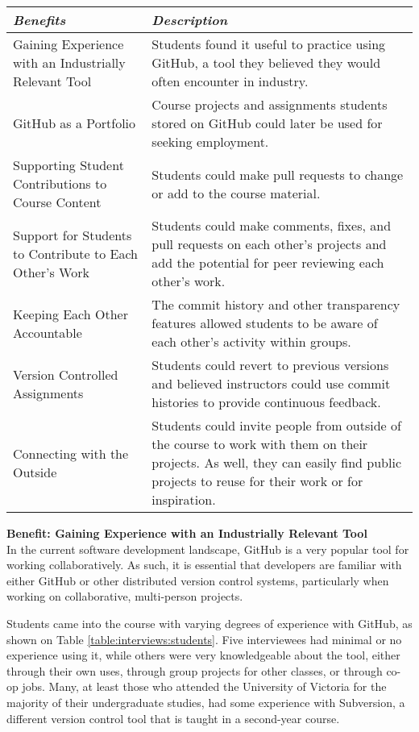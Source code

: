 \begin{center}
\begin{tabular}{ | m{2em} | m{5cm} | }
\hline
\emph{Benefits} & \emph{Description} \\
\hline
Gaining Experience with an Industrially Relevant Tool & Students found it useful to practice using GitHub, a tool they believed they would often encounter in industry. \\
\hline
GitHub as a Portfolio & Course projects and assignments students stored on GitHub could later be used for seeking employment. \\
\hline
Supporting Student Contributions to Course Content & Students could make pull requests to change or add to the course material. \\
\hline
Support for Students to Contribute to Each Other's Work & Students could make comments, fixes, and pull requests on each other's projects and add the potential for peer reviewing each other's work. \\
\hline
Keeping Each Other Accountable & The commit history and other transparency features allowed students to be aware of each other's activity within groups. \\
\hline
Version Controlled Assignments & Students could revert to previous versions and believed instructors could use commit histories to provide continuous feedback. \\
\hline
Connecting with the Outside & Students could invite people from outside of the course to work with them on their projects. As well, they can easily find public projects to reuse for their work or for inspiration. \\
\hline
\end{tabular}
\end{center}

\textbf{Benefit: Gaining Experience with an Industrially Relevant Tool} \\
In the current software development landscape, GitHub is a very popular tool for working collaboratively. As such, it is essential that developers are familiar with either GitHub or other distributed version control systems, particularly when working on collaborative, multi-person projects.

Students came into the course with varying degrees of experience with GitHub, as shown on Table \ref{table:interviews:students}. Five interviewees had minimal or no experience using it, while others were very knowledgeable about the tool, either through their own uses, through group projects for other classes, or through co-op jobs. Many, at least those who attended the University of Victoria for the majority of their undergraduate studies, had some experience with Subversion, a different version control tool that is taught in a second-year course.


